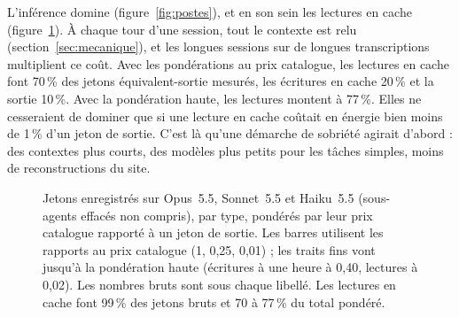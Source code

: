 \documentclass[11pt,a4paper]{article}
\begin{document}
L'inférence domine (figure~\ref{fig:postes}), et en son sein les lectures en cache (figure~\ref{fig:jetons}). À chaque tour d'une session, tout le contexte est relu (section~\ref{sec:mecanique}), et les longues sessions sur de longues transcriptions multiplient ce coût. Avec les pondérations au prix catalogue, les lectures en cache font 70\,\% des jetons équivalent-sortie mesurés, les écritures en cache 20\,\% et la sortie 10\,\%. Avec la pondération haute, les lectures montent à 77\,\%. Elles ne cesseraient de dominer que si une lecture en cache coûtait en énergie bien moins de 1\,\% d'un jeton de sortie. C'est là qu'une démarche de sobriété agirait d'abord : des contextes plus courts, des modèles plus petits pour les tâches simples, moins de reconstructions du site.

\begin{figure}[h]\centering
{}
\caption{Jetons enregistrés sur Opus~5.5, Sonnet~5.5 et Haiku~5.5 (sous-agents effacés non compris), par type, pondérés par leur prix catalogue rapporté à un jeton de sortie. Les barres utilisent les rapports au prix catalogue (1, 0,25, 0,01) ; les traits fins vont jusqu'à la pondération haute (écritures à une heure à 0,40, lectures à 0,02). Les nombres bruts sont sous chaque libellé. Les lectures en cache font 99\,\% des jetons bruts et 70 à 77\,\% du total pondéré.}\label{fig:jetons}
\end{figure}
\end{document}
